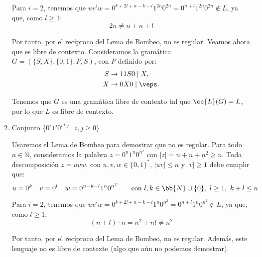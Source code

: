 \begin{ejercicio}
\begin{enumerate}
        Para $i=2$, tenemos que $uv^iw=0^{k+2l+n-k-l}1^{2n}0^{2n}=0^{n+l}1^{2n}0^{2n}\notin L$, ya que, como $l\geq 1$:
        \begin{equation*}
            2n\neq n+n+l
        \end{equation*}

        Por tanto, por el recíproco del Lema de Bombeo, no es regular.
        Veamos ahora que es libre de contexto. Consideramos la gramática $G=(\{S,X\},\{0,1\},P,S)$, con $P$ definido por:
        \begin{align*}
            S &\rightarrow 11S0 \mid X,\\
            X &\rightarrow 0X0 \mid \veps.
        \end{align*}

        Tenemos que $G$ es una gramática libre de contexto tal que $\cc{L}(G)=L$, por lo que $L$ es libre de contexto.

        \item Conjunto $\{0^i 1^{j} 0^{i\ast j}\mid i,j\geq 0\}$
        
        Usaremos el Lema de Bombeo para demostrar que no es regular. Para todo $n\in \mathbb{N}$, consideramos la palabra $z=0^n1^{n}0^{n^2}$ con $|z|=n+n+n^2\geq n$. Toda descomposición $z=uvw$, con $u,v,w\in \{0,1\}^\ast$, $|uv|\leq n$ y $|v|\geq 1$ debe cumplir que:
        \begin{equation*}
            u=0^k \quad v=0^l \quad w=0^{n-k-l}1^{n}0^{n^2} \qquad \text{con } l,k\in \bb{N}\cup \{0\},~l\geq 1,~k+l\leq n
        \end{equation*}

        Para $i=2$, tenemos que $uv^iw=0^{k+2l+n-k-l}1^{n}0^{n^2}=0^{n+l}1^{n}0^{n^2}\notin L$, ya que, como $l\geq 1$:
        \begin{equation*}
            (n+l)\cdot n = n^2+nl \neq n^2
        \end{equation*}

        Por tanto, por el recíproco del Lema de Bombeo, no es regular.
        Además, este lenguaje no es libre de contexto (algo que aún no podemos demostrar).
    \end{enumerate}
\end{ejercicio}

